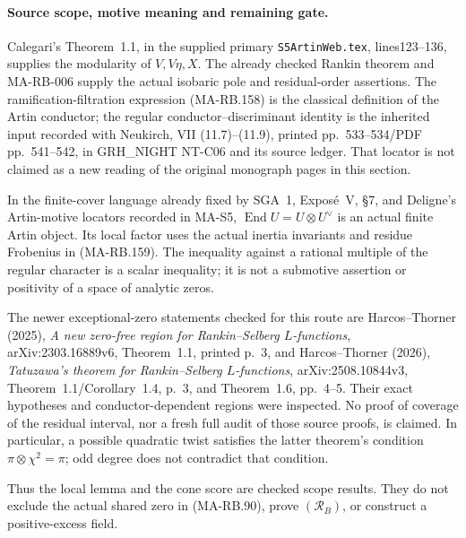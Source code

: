 \paragraph{Source scope, motive meaning and remaining gate.}
Calegari's Theorem~1.1, in the supplied primary
\texttt{S5ArtinWeb.tex}, lines123--136, supplies the
modularity of \(V,V\eta,X\).  The already checked
Rankin theorem and MA-RB-006 supply the actual
isobaric pole and residual-order assertions.
The ramification-filtration expression (MA-RB.158)
is the classical definition of the Artin conductor;
the regular conductor--discriminant identity is the
inherited input recorded with Neukirch, VII
(11.7)--(11.9), printed pp.~533--534/PDF pp.~541--542,
in GRH\_NIGHT NT-C06 and its source ledger.
That locator is not claimed as a new reading of
the original monograph pages in this section.

In the finite-cover language already fixed by SGA~1,
Expos\'e~V, \S7, and Deligne's Artin-motive locators
recorded in MA-S5, \(\operatorname{End}U=U\otimes U^\vee\)
is an actual finite Artin object.  Its local factor
uses the actual inertia invariants and residue
Frobenius in (MA-RB.159).  The inequality against
a rational multiple of the regular character is
a scalar inequality; it is not a submotive assertion
or positivity of a space of analytic zeros.

The newer exceptional-zero statements checked for
this route are Harcos--Thorner (2025),
\emph{A new zero-free region for Rankin--Selberg
\(L\)-functions}, arXiv:2303.16889v6, Theorem~1.1,
printed p.~3, and Harcos--Thorner (2026),
\emph{Tatuzawa's theorem for
Rankin--Selberg \(L\)-functions},
arXiv:2508.10844v3, Theorem~1.1/Corollary~1.4,
p.~3, and Theorem~1.6, pp.~4--5.
Their exact hypotheses and conductor-dependent
regions were inspected.  No proof of coverage of
the residual interval, nor a fresh full audit of
those source proofs, is claimed.
In particular, a possible quadratic twist satisfies
the latter theorem's condition
\(\pi\otimes\chi^2=\pi\); odd degree does not
contradict that condition.

Thus the local lemma and the cone score are checked
scope results.  They do not exclude the actual
shared zero in (MA-RB.90), prove \((\mathcal R_B)\),
or construct a positive-excess field.
